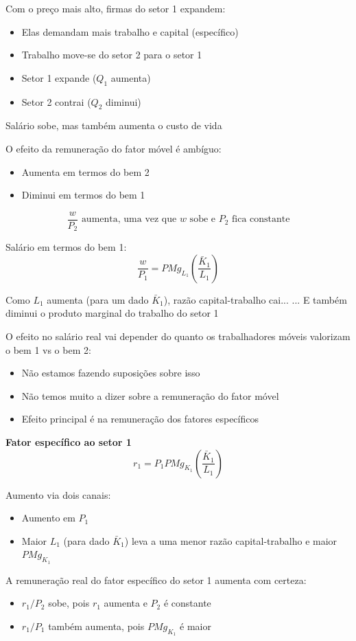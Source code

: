 \documentclass[a4paper,12pt]{article}[abntex2]
\begin{document}
Com o preço mais alto, firmas do setor 1 expandem:
\begin{itemize}
  \item Elas demandam mais trabalho e capital (específico)
  \item Trabalho move-se do setor 2 para o setor 1
  \item Setor 1 expande ($Q_1$ aumenta)
  \item Setor 2 contrai ($Q_2$ diminui)
\end{itemize}

Salário sobe, mas também aumenta o custo de vida

O efeito da remuneração do fator móvel é ambíguo:
\begin{itemize}
  \item Aumenta em termos do bem 2
  \item Diminui em termos do bem 1
\end{itemize}

\[
\frac{w}{P_2} \text{ aumenta, uma vez que } w \text{ sobe e } P_2 \text{ fica constante}
\]

Salário em termos do bem 1:
\[
\frac{w}{P_1} = PMg_{L_1} \left( \frac{\bar{K}_1}{L_1} \right)
\]

Como $L_1$ aumenta (para um dado $\bar{K}_1$), razão capital-trabalho cai...  
... E também diminui o produto marginal do trabalho do setor 1

O efeito no salário real vai depender do quanto os trabalhadores móveis valorizam o bem 1 vs o bem 2:
\begin{itemize}
  \item Não estamos fazendo suposições sobre isso
  \item Não temos muito a dizer sobre a remuneração do fator móvel
  \item Efeito principal é na remuneração dos fatores específicos
\end{itemize}

\textbf{Fator específico ao setor 1}
\[
r_1 = P_1 PMg_{K_1} \left( \frac{\bar{K}_1}{L_1} \right)
\]

Aumento via dois canais:
\begin{itemize}
  \item Aumento em $P_1$
  \item Maior $L_1$ (para dado $\bar{K}_1$) leva a uma menor razão capital-trabalho e maior $PMg_{K_1}$
\end{itemize}

A remuneração real do fator específico do setor 1 aumenta com certeza:
\begin{itemize}
  \item $r_1 / P_2$ sobe, pois $r_1$ aumenta e $P_2$ é constante
  \item $r_1 / P_1$ também aumenta, pois $PMg_{K_1}$ é maior
\end{itemize}
\end{document}
